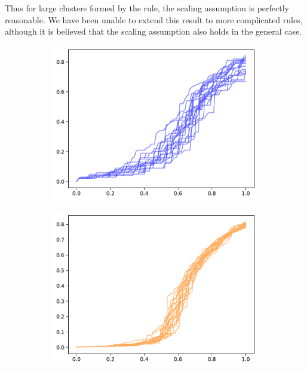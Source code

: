 \documentclass[twoside,10pt]{article}
\begin{document}
Thus for large clusters formed by the \ER rule, the scaling assumption is perfectly reasonable. We have been unable to extend this result to more complicated rules, although it is believed that the scaling assumption also holds in the general case.

\begin{figure}[H]
        \centering
        \begin{subfigure}
                \centering
                \includegraphics[scale=0.3]{fig/100.pdf}
        \end{subfigure}
        \begin{subfigure}
                \centering
                \includegraphics[scale=0.3]{fig/1000.pdf}

\end{subfigure}
\end{figure}
\end{document}
